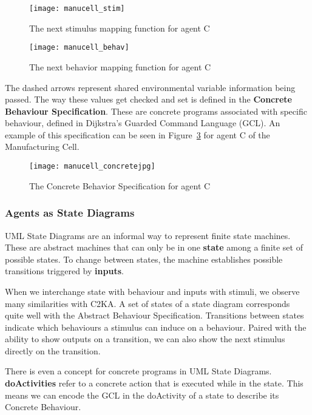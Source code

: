 \begin{figure}[h]
    \centering
    \texttt{[image: manucell\_stim]}
    \caption{The next stimulus mapping function for agent C~\cite{manu_cell}}
    \label{fig:manucell_stim}
\end{figure}
\begin{figure}[h]
    \centering
    \texttt{[image: manucell\_behav]}
    \caption{The next behavior mapping function for agent C~\cite{manu_cell}}
    \label{fig:manucell_behav}
\end{figure}

The dashed arrows represent shared environmental variable information being passed.
The way these values get checked and set is defined in the \textbf{Concrete Behaviour Specification}.
These are concrete programs associated with specific behaviour, defined in Dijkstra's Guarded Command Language (GCL).
An example of this specification can be seen in Figure~\ref{fig:manu_concrete} for agent C of the Manufacturing Cell.
\begin{figure}
    \centering
    \texttt{[image: manucell\_concretejpg]}
    \caption{The Concrete Behavior Specification for agent C~\cite{manu_cell}}
    \label{fig:manu_concrete}
\end{figure}

\subsubsection{Agents as State Diagrams}\label{subsubsec:diagram-agents}
UML State Diagrams are an informal way to represent finite state machines.
These are abstract machines that can only be in one \textbf{state} among a finite set of possible states.
To change between states, the machine establishes possible transitions triggered by \textbf{inputs}.

When we interchange state with behaviour and inputs with stimuli, we observe many similarities with C2KA\@.
A set of states of a state diagram corresponds quite well with the Abstract Behaviour Specification.
Transitions between states indicate which behaviours a stimulus can induce on a behaviour.
Paired with the ability to show outputs on a transition, we can also show the next stimulus directly on the transition.

There is even a concept for concrete programs in UML State Diagrams.
\textbf{doActivities} refer to a concrete action that is executed while in the state.
This means we can encode the GCL in the doActivity of a state to describe its Concrete Behaviour.

